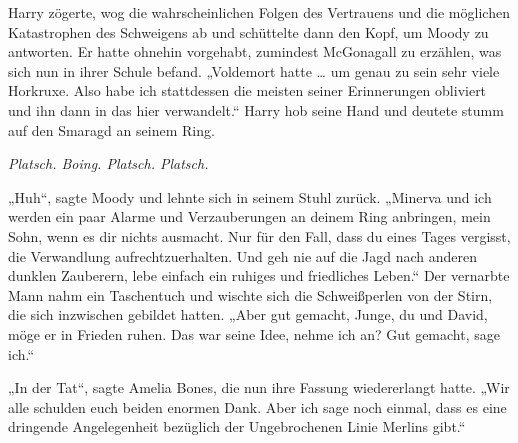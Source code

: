 Harry zögerte, wog die wahrscheinlichen Folgen des Vertrauens und die möglichen Katastrophen des Schweigens ab und schüttelte dann den Kopf, um Moody zu antworten. Er hatte ohnehin vorgehabt, zumindest McGonagall zu erzählen, was sich nun in ihrer Schule befand.
„Voldemort hatte … um genau zu sein sehr viele Horkruxe. Also habe ich stattdessen die meisten seiner Erinnerungen obliviert und ihn dann in das hier verwandelt.“
Harry hob seine Hand und deutete stumm auf den Smaragd an seinem Ring.

\emph{Platsch. Boing. Platsch. Platsch.}

„Huh“, sagte Moody und lehnte sich in seinem Stuhl zurück.
„Minerva und ich werden ein paar Alarme und Verzauberungen an deinem Ring anbringen, mein Sohn, wenn es dir nichts ausmacht. Nur für den Fall, dass du eines Tages vergisst, die Verwandlung aufrechtzuerhalten. Und geh nie auf die Jagd nach anderen dunklen Zauberern, lebe einfach ein ruhiges und friedliches Leben.“
Der vernarbte Mann nahm ein Taschentuch und wischte sich die Schweißperlen von der Stirn, die sich inzwischen gebildet hatten.
„Aber gut gemacht, Junge, du und David, möge er in Frieden ruhen. Das war seine Idee, nehme ich an? Gut gemacht, sage ich.“

„In der Tat“, sagte Amelia Bones, die nun ihre Fassung wiedererlangt hatte.
„Wir alle schulden euch beiden enormen Dank. Aber ich sage noch einmal, dass es eine dringende Angelegenheit bezüglich der Ungebrochenen Linie Merlins gibt.“

